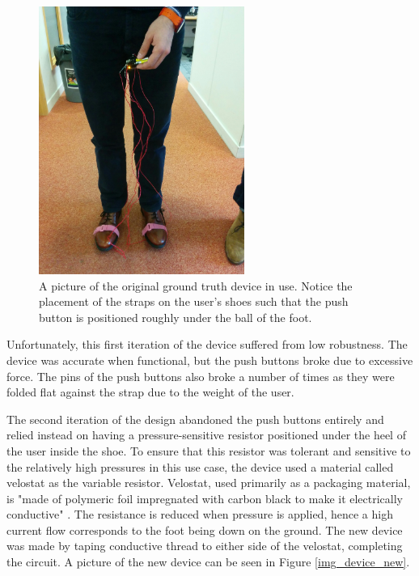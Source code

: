             \begin{figure}[!th]
                \includegraphics[width=0.6\textwidth]{Images/device_og_use.jpg}
                \centering
                \caption{A picture of the original ground truth device in use. Notice the placement of the straps on the user's shoes such that the push button is positioned roughly under the ball of the foot.}
                \label{img_device_og_use}
            \end{figure}

            Unfortunately, this first iteration of the device suffered from low robustness. The device was accurate when functional, but the push buttons broke due to excessive force. The pins of the push buttons also broke a number of times as they were folded flat against the strap due to the weight of the user.

            The second iteration of the design abandoned the push buttons entirely and relied instead on having a pressure-sensitive resistor positioned under the heel of the user inside the shoe. To ensure that this resistor was tolerant and sensitive to the relatively high pressures in this use case, the device used a material called velostat as the variable resistor. Velostat, used primarily as a packaging material, is "made of polymeric foil impregnated with carbon black to make it electrically conductive" \cite{velostat}. The resistance is reduced when pressure is applied, hence a high current flow corresponds to the foot being down on the ground. The new device was made by taping conductive thread to either side of the velostat, completing the circuit. A picture of the new device can be seen in Figure \ref{img_device_new}.

